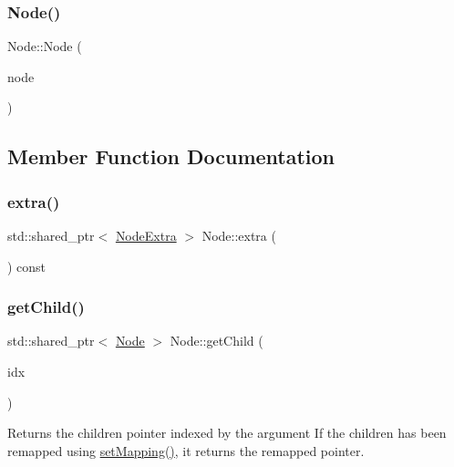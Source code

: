 \subsubsection{\texorpdfstring{Node()}{Node()}}
{\footnotesize\ttfamily Node\+::\+Node (\begin{DoxyParamCaption}\item[{std\+::shared\+\_\+ptr$<$ \mbox{\hyperlink{classdtree_1_1_decision_tree}{Decision\+Tree}} $>$}]{node }\end{DoxyParamCaption})\hspace{0.3cm}{\ttfamily [explicit]}}



\subsection{Member Function Documentation}
\mbox{\label{classdtree_1_1_node_a73de9259c0366a4d323c2b601ac97a36}} 
\subsubsection{\texorpdfstring{extra()}{extra()}}
{\footnotesize\ttfamily std\+::shared\+\_\+ptr$<$ \mbox{\hyperlink{classdtree_1_1_node_extra}{Node\+Extra}} $>$ Node\+::extra (\begin{DoxyParamCaption}{ }\end{DoxyParamCaption}) const}

\mbox{\label{classdtree_1_1_node_aede43a583b04a97ecd840e078a9ad0bd}} 
\subsubsection{\texorpdfstring{getChild()}{getChild()}}
{\footnotesize\ttfamily std\+::shared\+\_\+ptr$<$ \mbox{\hyperlink{classdtree_1_1_node}{Node}} $>$ Node\+::get\+Child (\begin{DoxyParamCaption}\item[{int}]{idx }\end{DoxyParamCaption})}



Returns the children pointer indexed by the argument If the children has been remapped using \mbox{\hyperlink{classdtree_1_1_node_a8dd25ca52f48a197d24662b366166fc6}{set\+Mapping()}}, it returns the remapped pointer. 


